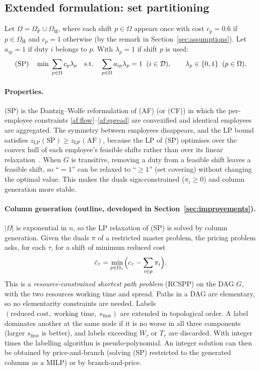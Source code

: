 \subsection{Extended formulation: set partitioning}
\label{sec:sp}

Let $\Omega=\Omega_{\mathrm F}\cup\Omega_{\mathrm H}$, where each shift
$p\in\Omega$ appears once with cost $c_p=0.6$ if $p\in\Omega_{\mathrm H}$ and
$c_p=1$ otherwise (by the remark in Section~\ref{sec:assumptions}). Let
$a_{ip}=1$ if duty $i$ belongs to $p$. With $\lambda_p=1$ if shift $p$ is
used:
\begin{align}
\text{(SP)}\quad
\min\;\sum_{p\in\Omega}c_p\lambda_p
\quad\text{s.t.}\quad
\sum_{p\in\Omega}a_{ip}\lambda_p=1\;\; (i\in\mathcal{D}),\qquad
\lambda_p\in\{0,1\}\;\;(p\in\Omega).
\label{sp}
\end{align}

\paragraph{Properties.}
(SP) is the Dantzig--Wolfe reformulation of (AF) (or (CF)) in which the
per-employee constraints \eqref{af:flow}--\eqref{af:spread} are convexified
and identical employees are aggregated. The symmetry between employees
disappears, and the LP bound satisfies
$z_{\mathrm{LP}}(\mathrm{SP})\ge z_{\mathrm{LP}}(\mathrm{AF})$, because the LP
of (SP) optimises over the convex hull of each employee's feasible shifts
rather than over its linear relaxation~\cite{desaulniers2005column}. When $G$
is transitive, removing a duty from a feasible shift leaves a feasible shift,
so ``$=1$'' can be relaxed to ``$\ge 1$'' (set covering) without changing the
optimal value. This makes the duals sign-constrained ($\pi_i\ge 0$) and column
generation more stable.

\paragraph{Column generation (outline, developed in Section~\ref{sec:improvements}).}
$|\Omega|$ is exponential in $n$, so the LP relaxation of (SP) is solved by
column generation. Given the duals $\pi$ of a restricted master problem, the
pricing problem asks, for each $\tau$, for a shift of minimum reduced cost
\[
  \bar c_\tau=\min_{p\in\Omega_\tau}\Bigl(c_\tau-\sum_{i\in p}\pi_i\Bigr).
\]
This is a \emph{resource-constrained shortest path problem} (RCSPP) on the DAG
$G$, with the two resources working time and spread. Paths in a DAG are
elementary, so no elementarity constraints are needed. Labels
$(\text{reduced cost},\;\text{working time},\;s_{\text{first}})$ are extended
in topological order. A label dominates another at the same node if it is no
worse in all three components (larger $s_{\text{first}}$ is better), and
labels exceeding $W_\tau$ or $T_\tau$ are discarded. With integer times the
labelling algorithm is pseudo-polynomial. An integer solution can then be
obtained by price-and-branch (solving (SP) restricted to the generated
columns as a MILP) or by branch-and-price.

